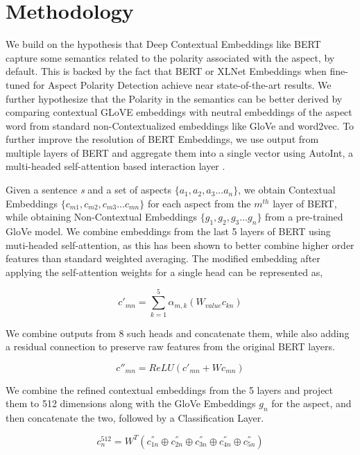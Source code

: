 \documentclass[11pt,a4paper]{article}
\begin{document}
\section{Methodology}


We build on the hypothesis that Deep Contextual Embeddings like BERT capture some semantics related to the polarity associated with the aspect, by default. This is backed by the fact that BERT or XLNet Embeddings when fine-tuned for Aspect Polarity Detection achieve near state-of-the-art results. We further hypothesize that the Polarity in the semantics can be better derived by comparing contextual GLoVE embeddings with neutral embeddings of the aspect word from standard non-Contextualized embeddings like GloVe and word2vec. To further improve the resolution of BERT Embeddings, we use output from multiple layers of BERT and aggregate them into a single vector using AutoInt, a multi-headed self-attention based interaction layer \cite{Song_2019}. 

Given a sentence \textit{s} and a set of aspects \(\{a_1, a_2, a_3 ... a_n\}\), we obtain Contextual Embeddings \(\{c_{m1}, c_{m2}, c_{m3} ... c_{mn}\}\) for each aspect from the \(m^{th}\) layer of BERT, while obtaining Non-Contextual Embeddings \(\{g_1, g_2, g_3 ... g_n\}\) from a pre-trained GloVe model. We combine embeddings from the last 5 layers of BERT using muti-headed self-attention, as this has been shown to better combine higher order features than standard weighted averaging. The modified embedding after applying the self-attention weights for a single head can be represented as,

\begin{equation}
    c'_{mn}{} = \sum_{k = 1}^{5}\alpha_{m,k}(W_{value}c_{kn})
\end{equation}

We combine outputs from 8 such heads and concatenate them, while also adding a residual connection to preserve raw features from the original BERT layers. 

\begin{equation}
    c''^{}_{mn}{} = ReLU(c'^{}_{mn}{} + Wc^{}_{mn}{})
\end{equation}

We combine the refined contextual embeddings from the 5 layers and project them to 512 dimensions along with the GloVe Embeddings \(g_{n}\) for the aspect, and then concatenate the two, followed by a Classification Layer. 

\begin{equation}
    c_{n}^{512} = W^{T}(c^{''}_{1n} \oplus c^{''}_{2n} \oplus c^{''}_{3n} \oplus c^{''}_{4n} \oplus c^{''}_{5n}) 
\end{equation}
\end{document}
